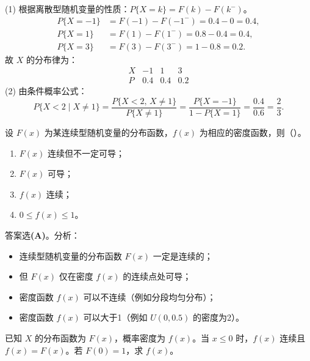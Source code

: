 ﻿\documentclass[lang=cn,11pt]{elegantbook}
\begin{document}
\begin{solution}
(1) 根据离散型随机变量的性质：$P\{X=k\} = F(k) - F(k^-)$。
\begin{align*}
P\{X=-1\} &= F(-1) - F(-1^-) = 0.4 - 0 = 0.4, \\
P\{X=1\} &= F(1) - F(1^-) = 0.8 - 0.4 = 0.4, \\
P\{X=3\} &= F(3) - F(3^-) = 1 - 0.8 = 0.2.
\end{align*}
故 $X$ 的分布律为：
\[
\begin{array}{c|ccc}
X & -1 & 1 & 3 \\
\hline
P & 0.4 & 0.4 & 0.2
\end{array}
\]
(2) 由条件概率公式：
\[
P\{X<2 \mid X \neq 1\} = \frac{P\{X<2,\, X \neq 1\}}{P\{X \neq 1\}} = \frac{P\{X=-1\}}{1-P\{X=1\}} = \frac{0.4}{0.6} = \frac{2}{3}.
\]
\end{solution}

\begin{exercise}[连续型分布函数性质] 
设 $F(x)$ 为某连续型随机变量的分布函数，$f(x)$ 为相应的密度函数，则（\quad）。
\begin{enumerate}
    \item[(A)] $F(x)$ 连续但不一定可导；
    \item[(B)] $F(x)$ 可导；
    \item[(C)] $f(x)$ 连续；
    \item[(D)] $0\leqslant f(x)\leqslant1$。
\end{enumerate}
\end{exercise}
\begin{solution}
答案选\textbf{(A)}。分析：
\begin{itemize}
    \item 连续型随机变量的分布函数 $F(x)$ 一定是连续的；
    \item 但 $F(x)$ 仅在密度 $f(x)$ 的连续点处可导；
    \item 密度函数 $f(x)$ 可以不连续（例如分段均匀分布）；
    \item 密度函数 $f(x)$ 可以大于1（例如 $U(0,0.5)$ 的密度为2）。
\end{itemize}
\end{solution}


\begin{exercise}\label{exer:2-6}
已知 $X$ 的分布函数为 $F(x)$，概率密度为 $f(x)$。当 $x \le 0$ 时，$f(x)$ 连续且 $f(x) = F(x)$。若 $F(0) = 1$，求 $f(x)$。
\end{exercise}
\end{document}
